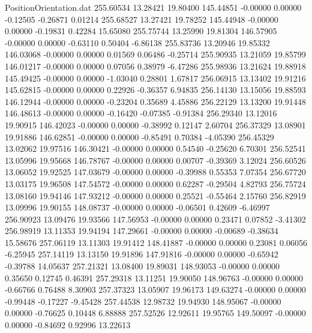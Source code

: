 \begin{filecontents}{PositionOrientation.dat}
 255.60534   13.28421   19.80400   145.44851   -0.00000    0.00000   -0.12505   -0.26871    0.01214
 255.68527   13.27421   19.78252   145.44948   -0.00000    0.00000   -0.19831    0.42284   15.65080
 255.75744   13.25990   19.81304   146.57905   -0.00000    0.00000   -0.63110    0.50404   -6.86138
 255.83736   13.20946   19.85332   146.03068   -0.00000    0.00000    0.01569    0.06486   -0.25714
 255.90935   13.21059   19.85799   146.01217   -0.00000    0.00000    0.07056    0.38979   -6.47286
 255.98936   13.21624   19.88918   145.49425   -0.00000    0.00000   -1.03040    0.28801    1.67817
 256.06915   13.13402   19.91216   145.62815   -0.00000    0.00000    0.22926   -0.36357    6.94835
 256.14130   13.15056   19.88593   146.12944   -0.00000    0.00000   -0.23204    0.35689    4.45886
 256.22129   13.13200   19.91448   146.48613   -0.00000    0.00000   -0.16420   -0.07385   -0.91384
 256.29340   13.12016   19.90915   146.42023   -0.00000    0.00000   -0.38992    0.12147    2.60704
 256.37329   13.08901   19.91886   146.62851   -0.00000    0.00000   -0.85491    0.70384   -4.05390
 256.45329   13.02062   19.97516   146.30421   -0.00000    0.00000    0.54540   -0.25620    6.70301
 256.52541   13.05996   19.95668   146.78767   -0.00000    0.00000    0.00707   -0.39369    3.12024
 256.60526   13.06052   19.92525   147.03679   -0.00000    0.00000   -0.39988    0.55353    7.07354
 256.67720   13.03175   19.96508   147.54572   -0.00000    0.00000    0.62287   -0.29504    4.82793
 256.75724   13.08160   19.94146   147.93212   -0.00000    0.00000    0.25521   -0.55464    2.15760
 256.82919   13.09996   19.90155   148.08737   -0.00000    0.00000   -0.06501    0.42609   -6.46997
 256.90923   13.09476   19.93566   147.56953   -0.00000    0.00000    0.23471    0.07852   -3.41302
 256.98919   13.11353   19.94194   147.29661   -0.00000    0.00000   -0.00689   -0.38634   15.58676
 257.06119   13.11303   19.91412   148.41887   -0.00000    0.00000    0.23081    0.06056   -6.25945
 257.14119   13.13150   19.91896   147.91816   -0.00000    0.00000   -0.65942   -0.39788   14.05637
 257.21321   13.08400   19.89031   148.93053   -0.00000    0.00000    0.35650    0.12745    0.46391
 257.29318   13.11251   19.90050   148.96763   -0.00000    0.00000   -0.66766    0.76488    8.30903
 257.37323   13.05907   19.96173   149.63274   -0.00000    0.00000   -0.99448   -0.17227   -9.45428
 257.44538   12.98732   19.94930   148.95067   -0.00000    0.00000   -0.76625    0.10448    6.88888
 257.52526   12.92611   19.95765   149.50097   -0.00000    0.00000   -0.84692    0.92996   13.22613

\end{filecontents}
